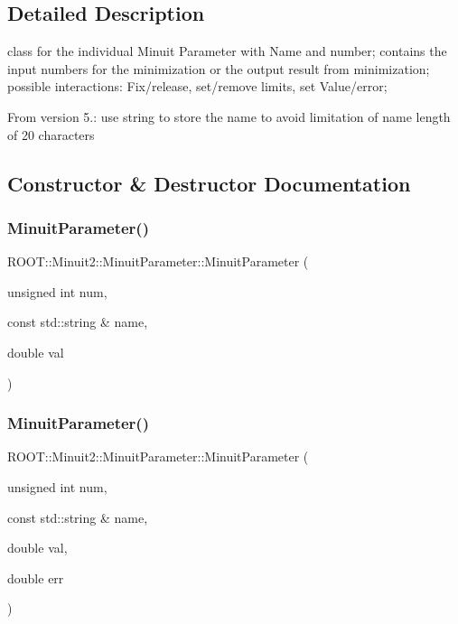 \subsection{Detailed Description}
class for the individual Minuit Parameter with Name and number; contains the input numbers for the minimization or the output result from minimization; possible interactions\+: Fix/release, set/remove limits, set Value/error;

From version 5.\+: use string to store the name to avoid limitation of name length of 20 characters 

\subsection{Constructor \& Destructor Documentation}
\mbox{\label{classROOT_1_1Minuit2_1_1MinuitParameter_afa9a57b4990491316502a21e09b756bc}} 
\subsubsection{\texorpdfstring{MinuitParameter()}{MinuitParameter()}\hspace{0.1cm}{\footnotesize\ttfamily [1/8]}}
{\footnotesize\ttfamily R\+O\+O\+T\+::\+Minuit2\+::\+Minuit\+Parameter\+::\+Minuit\+Parameter (\begin{DoxyParamCaption}\item[{unsigned int}]{num,  }\item[{const std\+::string \&}]{name,  }\item[{double}]{val }\end{DoxyParamCaption})\hspace{0.3cm}{\ttfamily [inline]}}

\mbox{\label{classROOT_1_1Minuit2_1_1MinuitParameter_a56d290ba2abc3c599cff99187329a91a}} 
\subsubsection{\texorpdfstring{MinuitParameter()}{MinuitParameter()}\hspace{0.1cm}{\footnotesize\ttfamily [2/8]}}
{\footnotesize\ttfamily R\+O\+O\+T\+::\+Minuit2\+::\+Minuit\+Parameter\+::\+Minuit\+Parameter (\begin{DoxyParamCaption}\item[{unsigned int}]{num,  }\item[{const std\+::string \&}]{name,  }\item[{double}]{val,  }\item[{double}]{err }\end{DoxyParamCaption})\hspace{0.3cm}{\ttfamily [inline]}}

